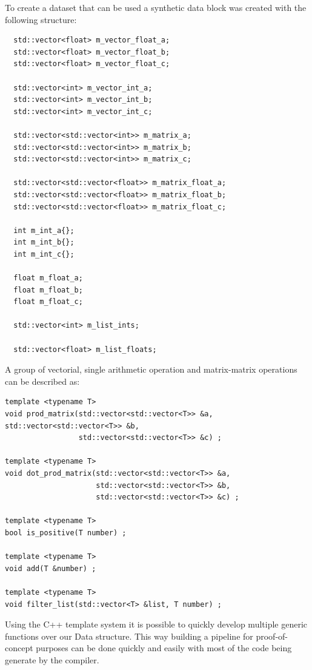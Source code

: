 To create a dataset that can be used a synthetic data block was created with the following structure:
\begin{lstlisting}
  std::vector<float> m_vector_float_a;
  std::vector<float> m_vector_float_b;
  std::vector<float> m_vector_float_c;

  std::vector<int> m_vector_int_a;
  std::vector<int> m_vector_int_b;
  std::vector<int> m_vector_int_c;

  std::vector<std::vector<int>> m_matrix_a;
  std::vector<std::vector<int>> m_matrix_b;
  std::vector<std::vector<int>> m_matrix_c;

  std::vector<std::vector<float>> m_matrix_float_a;
  std::vector<std::vector<float>> m_matrix_float_b;
  std::vector<std::vector<float>> m_matrix_float_c;

  int m_int_a{};
  int m_int_b{};
  int m_int_c{};

  float m_float_a;
  float m_float_b;
  float m_float_c;

  std::vector<int> m_list_ints;

  std::vector<float> m_list_floats;

\end{lstlisting}
A group of vectorial, single arithmetic operation and matrix-matrix operations can be described as:
\begin{lstlisting}
template <typename T>
void prod_matrix(std::vector<std::vector<T>> &a, std::vector<std::vector<T>> &b,
                 std::vector<std::vector<T>> &c) ;

template <typename T>
void dot_prod_matrix(std::vector<std::vector<T>> &a,
                     std::vector<std::vector<T>> &b,
                     std::vector<std::vector<T>> &c) ;

template <typename T>
bool is_positive(T number) ;

template <typename T>
void add(T &number) ;

template <typename T>
void filter_list(std::vector<T> &list, T number) ;
\end{lstlisting}

Using the C++ template system it is possible to quickly develop multiple generic functions over our Data structure. This way building a pipeline for proof-of-concept purposes can be done quickly and easily with most of the code being generate by the compiler.
